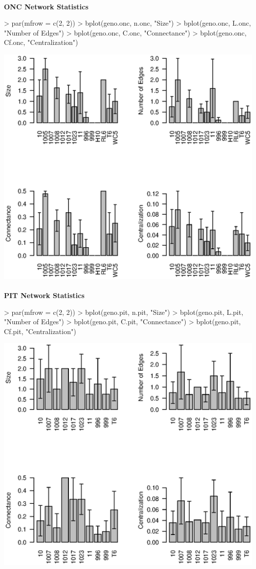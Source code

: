 \documentclass[11pt]{amsart}
\begin{document}
\newpage
\paragraph{}\textbf{ONC Network Statistics}
\begin{Schunk}
\begin{Sinput}
> par(mfrow = c(2, 2))
> bplot(geno.onc, n.onc, "Size")
> bplot(geno.onc, L.onc, "Number of Edges")
> bplot(geno.onc, C.onc, "Connectance")
> bplot(geno.onc, Cf.onc, "Centralization")
\end{Sinput}
\end{Schunk}
\includegraphics{LCO_analyses-021}

\newpage
\paragraph{}\textbf{PIT Network Statistics}

\begin{Schunk}
\begin{Sinput}
> par(mfrow = c(2, 2))
> bplot(geno.pit, n.pit, "Size")
> bplot(geno.pit, L.pit, "Number of Edges")
> bplot(geno.pit, C.pit, "Connectance")
> bplot(geno.pit, Cf.pit, "Centralization")
\end{Sinput}
\end{Schunk}
\includegraphics{LCO_analyses-022}
\end{document}
